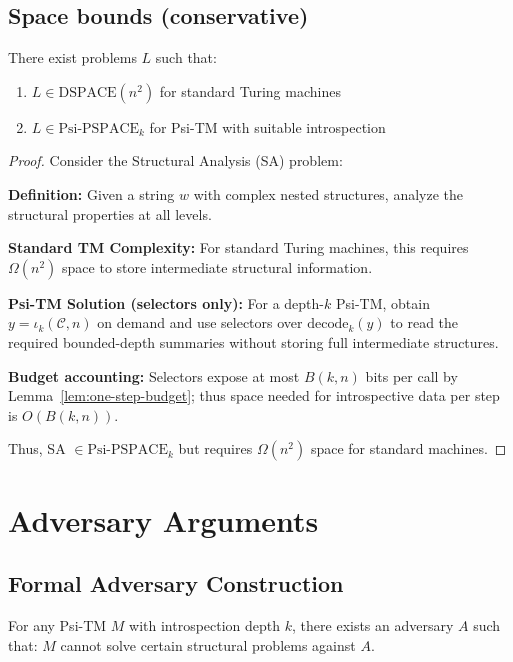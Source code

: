\subsection{Space bounds (conservative)}

\begin{theorem}
There exist problems $L$ such that:
\begin{enumerate}
\item $L \in \text{DSPACE}(n^2)$ for standard Turing machines
\item $L \in \text{Psi-PSPACE}_k$ for Psi-TM with suitable introspection
\end{enumerate}
\end{theorem}

\begin{proof}
Consider the Structural Analysis (SA) problem:

\textbf{Definition:} Given a string $w$ with complex nested structures, analyze the structural properties at all levels.

\textbf{Standard TM Complexity:}
For standard Turing machines, this requires $\Omega(n^2)$ space to store intermediate structural information.

\textbf{Psi-TM Solution (selectors only):}
For a depth-$k$ Psi-TM, obtain $y=\iota_k(\mathcal{C},n)$ on demand and use selectors over $\mathrm{decode}_k(y)$ to read the required bounded-depth summaries without storing full intermediate structures.

\textbf{Budget accounting:}
Selectors expose at most $B(k,n)$ bits per call by Lemma~\ref{lem:one-step-budget}; thus space needed for introspective data per step is $O(B(k,n))$.

Thus, SA $\in \text{Psi-PSPACE}_k$ but requires $\Omega(n^2)$ space for standard machines.
\end{proof}

\section{Adversary Arguments}

\subsection{Formal Adversary Construction}

\begin{theorem}
For any Psi-TM $M$ with introspection depth $k$, there exists an adversary $A$ such that:
$M$ cannot solve certain structural problems against $A$.
\end{theorem}

